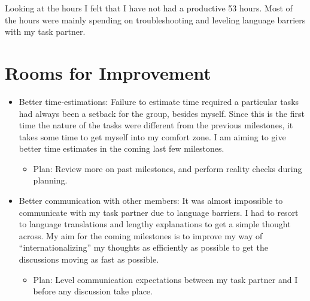 \documentclass{article}
\begin{document}
Looking at the hours I felt that I have not had a productive 53 hours. Most of the hours were mainly spending on troubleshooting and leveling language barriers with my task partner. 

\section*{Rooms for Improvement}

\begin{itemize}
   \item Better time-estimations: Failure to estimate time required a particular tasks had always been a setback for the group, besides myself. Since this is the first time the nature of the tasks were different from the previous milestones, it takes some time to get myself into my comfort zone. I am aiming to give better time estimates in the coming last few milestones. 
      \begin{itemize}
         \item Plan: Review more on past milestones, and perform reality checks during planning. 
      \end{itemize}
   \item Better communication with other members: It was almost impossible to communicate with my task partner due to language barriers. I had to resort to language translations and lengthy explanations to get a simple thought across. My aim for the coming milestones is to improve my way of ``internationalizing'' my thoughts as efficiently as possible to get the discussions moving as fast as possible. 
      \begin{itemize}
         \item Plan: Level communication expectations between my task partner and I before any discussion take place.
      \end{itemize}
\end{itemize}
\end{document}
